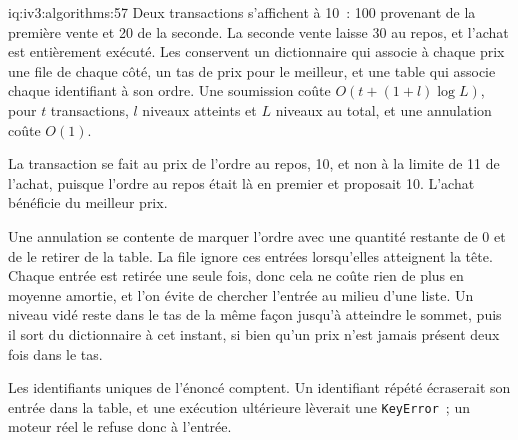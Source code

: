 \begin{solution}{iq:iv3:algorithms:57}
Deux transactions s'affichent à 10~: 100 provenant de la première vente et 20 de la seconde. La seconde vente laisse 30 au repos, et l'achat est entièrement exécuté. Les  conservent un dictionnaire qui associe à chaque prix une file de chaque côté, un tas de prix pour le meilleur, et une table qui associe chaque identifiant à son ordre. Une soumission coûte $O(t + (1 + l) \log L)$, pour $t$ transactions, $l$ niveaux atteints et $L$ niveaux au total, et une annulation coûte $O(1)$.
\label{lst:iv3:al:matching}
\label{lst:iv3:al:matchcancel}

La transaction se fait au prix de l'ordre au repos, 10, et non à la limite de 11 de l'achat, puisque l'ordre au repos était là en premier et proposait 10. L'achat bénéficie du meilleur prix.

Une annulation se contente de marquer l'ordre avec une quantité restante de 0 et de le retirer de la table. La file ignore ces entrées lorsqu'elles atteignent la tête. Chaque entrée est retirée une seule fois, donc cela ne coûte rien de plus en moyenne amortie, et l'on évite de chercher l'entrée au milieu d'une liste. Un niveau vidé reste dans le tas de la même façon jusqu'à atteindre le sommet, puis il sort du dictionnaire à cet instant, si bien qu'un prix n'est jamais présent deux fois dans le tas.

Les identifiants uniques de l'énoncé comptent. Un identifiant répété écraserait son entrée dans la table, et une exécution ultérieure lèverait une \texttt{KeyError}~; un moteur réel le refuse donc à l'entrée.

\end{solution}

